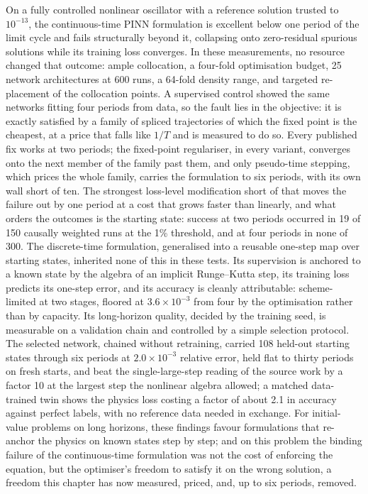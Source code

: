 \documentclass[11pt,a4paper]{article}
\begin{document}
On a fully controlled nonlinear oscillator with a reference solution
trusted to $10^{-13}$, the continuous-time PINN formulation is excellent
below one period of the limit cycle and fails structurally beyond it,
collapsing onto zero-residual spurious solutions while its training loss
converges. In these measurements, no resource changed that outcome: ample
collocation, a four-fold optimisation budget, 25 network architectures at
600 runs, a 64-fold density range, and targeted re-placement of the collocation points. A supervised control showed the same networks fitting four periods from data, so the fault lies in the objective: it is exactly satisfied by a family of spliced trajectories of which the fixed point is the cheapest, at a price that falls like $1/T$ and is measured to do so. Every published fix works at two periods; the fixed-point regulariser, in every variant, converges onto the next member of the family past them, and only pseudo-time stepping, which prices the whole family, carries the formulation to six periods, with its own wall short of ten. The strongest loss-level modification short of that moves the
failure out by one period at a cost that grows faster than linearly, and
what orders the outcomes is the starting state: success at two periods
occurred in 19 of 150 causally weighted runs at the 1\% threshold, and at
four periods in none of 300. The
discrete-time formulation, generalised into a reusable one-step map over
starting states, inherited none of this in these tests. Its supervision
is anchored to a known state by the algebra of an implicit Runge--Kutta
step, its training loss predicts its one-step error, and its accuracy is
cleanly attributable: scheme-limited at two stages, floored at
$3.6\times10^{-3}$ from four by the optimisation rather than by
capacity. Its long-horizon quality, decided by the training seed, is
measurable on a validation chain and controlled by a simple selection
protocol. The selected network, chained without retraining, carried 108
held-out starting states through six periods at $2.0\times10^{-3}$
relative error, held flat to thirty periods on fresh starts, and beat
the single-large-step reading of the source work by a factor 10 at the
largest step the nonlinear algebra allowed; a matched data-trained twin
shows the physics loss costing a factor of about 2.1 in accuracy against
perfect labels, with no reference data needed in exchange. For
initial-value problems on long horizons, these findings favour
formulations that re-anchor the physics on known states step by step;
and on this problem the binding failure of the continuous-time
formulation was not the cost of enforcing the equation, but the optimiser's freedom to satisfy it on the wrong solution, a freedom this chapter has now measured, priced, and, up to six periods, removed.
\end{document}
